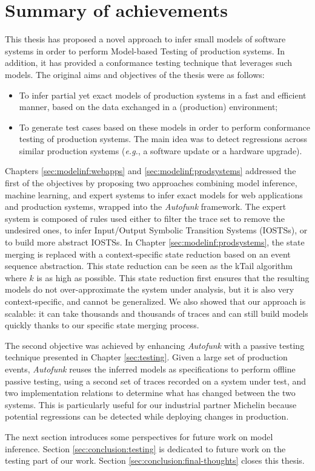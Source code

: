 \section{Summary of achievements}

This thesis has proposed a novel approach to infer small models
of software systems in order to perform Model-based Testing of
production systems. In addition, it has provided a conformance
testing technique that leverages such models. The original aims
and objectives of the thesis were as follows:

\begin{itemize}
    \item To infer partial yet exact models of production systems
        in a fast and efficient manner, based on the data
        exchanged in a (production) environment;

    \item To generate test cases based on these models in order
        to perform conformance testing of production systems. The
        main idea was to detect regressions across similar
        production systems (\emph{e.g.}, a software update or a
        hardware upgrade).
\end{itemize}

Chapters \ref{sec:modelinf:webapps} and
\ref{sec:modelinf:prodsystems} addressed the first of the
objectives by proposing two approaches combining model inference,
machine learning, and expert systems to infer exact models for
web applications and production systems, wrapped into the
\textit{Autofunk} framework.  The expert system is composed of
rules used either to filter the trace set to remove the undesired
ones, to infer Input/Output Symbolic Transition Systems (IOSTSs),
or to build more abstract IOSTSs. In Chapter
\ref{sec:modelinf:prodsystems}, the state merging is replaced
with a context-specific state reduction based on an event
sequence abstraction. This state reduction can be seen as the
kTail algorithm \cite{5009015} where $k$ is as high as possible.
This state reduction first ensures that the resulting models do
not over-approximate the system under analysis, but it is also
very context-specific, and cannot be generalized. We also showed
that our approach is scalable: it can take thousands and
thousands of traces and can still build models quickly thanks to
our specific state merging process.

The second objective was achieved by enhancing \textit{Autofunk}
with a passive testing technique presented in Chapter
\ref{sec:testing}. Given a large set of production events,
\textit{Autofunk} reuses the inferred models as specifications to
perform offline passive testing, using a second set of traces
recorded on a system under test, and two implementation relations
to determine what has changed between the two systems. This is
particularly useful for our industrial partner Michelin because
potential regressions can be detected while deploying changes in
production.

The next section introduces some perspectives for future work on
model inference. Section \ref{sec:conclusion:testing} is
dedicated to future work on the testing part of our work. Section
\ref{sec:conclusion:final-thoughts} closes this thesis.
